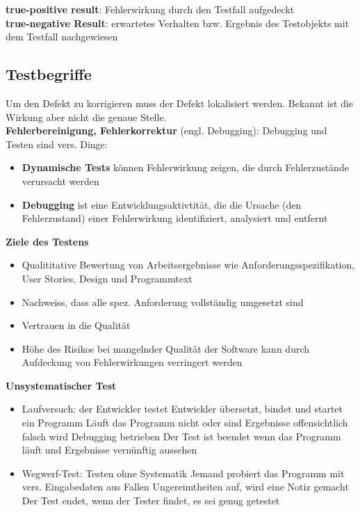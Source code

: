 \documentclass{report}
\theoremstyle{definition}
\theoremstyle{example}
\begin{document}
\textbf{true-positive result}: Fehlerwirkung durch den Testfall aufgedeckt\\

\textbf{true-negative Result}: erwartetes Verhalten bzw. Ergebnis des Testobjekts mit dem Testfall nachgewiesen

\subsection{Testbegriffe}
Um den Defekt zu korrigieren muss der Defekt lokalisiert werden. Bekannt ist die Wirkung aber nicht die genaue Stelle.\\
\textbf{Fehlerbereinigung, Fehlerkorrektur} (engl. Debugging): Debugging und Testen sind vers. Dinge:
\begin{itemize}
   \item \textbf{Dynamische Tests} können Fehlerwirkung zeigen, die durch Fehlerzustände verursacht werden
   \item \textbf{Debugging} ist eine Entwicklungsaktivtität, die die Ursache (den Fehlerzustand) einer Fehlerwirkung identifiziert, analysiert und entfernt
\end{itemize}


\textbf{Ziele des Testens}
\begin{itemize}
   \item Qualititative Bewertung von Arbeitsergebnisse wie Anforderungsspezifikation, User Stories, Design und Programmtext
   \item Nachweiss, dass alle spez. Anforderung vollständig umgesetzt sind
   \item Vertrauen in die Qualität
   \item Höhe des Risikos bei mangelnder Qualität der Software kann durch Aufdeckung von Fehlerwirkungen verringert werden
\end{itemize}

\textbf{Unsystematischer Test}
\begin{itemize}
   \item Laufversuch: der Entwickler testet
   \subitem Entwickler übersetzt, bindet und startet ein Programm
   \subitem Läuft das Programm nicht oder sind Ergebnisse offensichtlich falsch wird Debugging betrieben
   \subitem Der Test ist beendet wenn das Programm läuft und Ergebnisse vernünftig aussehen
   \item Wegwerf-Test: Testen ohne Systematik
   \subitem Jemand probiert das Programm mit vers. Eingabedaten aus
   \subitem Fallen Ungereimtheiten auf, wird eine Notiz gemacht
   \subitem Der Test endet, wenn der Tester findet, es sei genug getestet 
\end{itemize}
\end{document}
